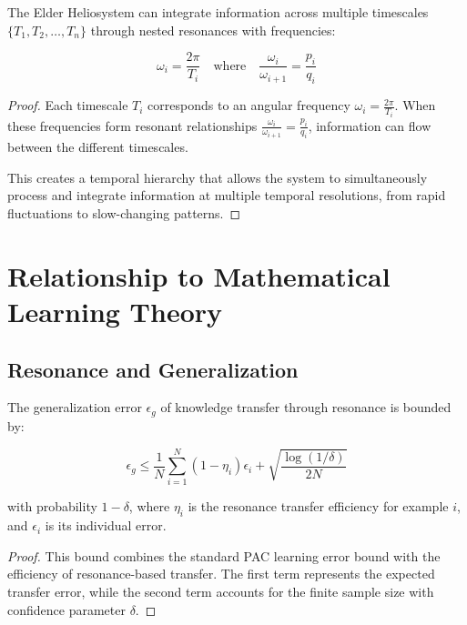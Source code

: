 \begin{theorem}
The Elder Heliosystem can integrate information across multiple timescales $\{T_1, T_2, \ldots, T_n\}$ through nested resonances with frequencies:

\begin{equation}
\omega_i = \frac{2\pi}{T_i} \quad \text{where} \quad \frac{\omega_i}{\omega_{i+1}} = \frac{p_i}{q_i}
\end{equation}
\end{theorem}

\begin{proof}
Each timescale $T_i$ corresponds to an angular frequency $\omega_i = \frac{2\pi}{T_i}$. When these frequencies form resonant relationships $\frac{\omega_i}{\omega_{i+1}} = \frac{p_i}{q_i}$, information can flow between the different timescales.

This creates a temporal hierarchy that allows the system to simultaneously process and integrate information at multiple temporal resolutions, from rapid fluctuations to slow-changing patterns.
\end{proof}

\section{Relationship to Mathematical Learning Theory}

\subsection{Resonance and Generalization}

\begin{theorem}
The generalization error $\epsilon_g$ of knowledge transfer through resonance is bounded by:

\begin{equation}
\epsilon_g \leq \frac{1}{N} \sum_{i=1}^N \left(1 - \eta_i\right) \epsilon_i + \sqrt{\frac{\log(1/\delta)}{2N}}
\end{equation}

with probability $1-\delta$, where $\eta_i$ is the resonance transfer efficiency for example $i$, and $\epsilon_i$ is its individual error.
\end{theorem}

\begin{proof}
This bound combines the standard PAC learning error bound with the efficiency of resonance-based transfer. The first term represents the expected transfer error, while the second term accounts for the finite sample size with confidence parameter $\delta$.
\end{proof}

